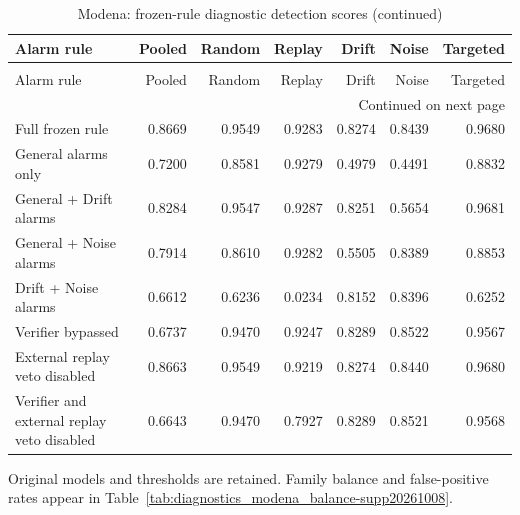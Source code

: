 \begingroup
\small
\setlength{\tabcolsep}{4pt}
\renewcommand{\arraystretch}{1.1}
\begin{longtable}{@{}p{.29\linewidth}rrrrrr@{}}
\caption{Modena: frozen-rule diagnostic detection scores}\label{tab:diagnostics_modena_detection-supp20261008}\\
\toprule
Alarm rule & Pooled & Random & Replay & Drift & Noise & Targeted \\
\midrule
\endfirsthead
\caption[]{Modena: frozen-rule diagnostic detection scores (continued)}\\
\toprule
Alarm rule & Pooled & Random & Replay & Drift & Noise & Targeted \\
\midrule
\endhead
\midrule
\multicolumn{7}{r}{Continued on next page}\\
\endfoot
\bottomrule
\endlastfoot
Full frozen rule & 0.8669 & 0.9549 & 0.9283 & 0.8274 & 0.8439 & 0.9680 \\
General alarms only & 0.7200 & 0.8581 & 0.9279 & 0.4979 & 0.4491 & 0.8832 \\
General + Drift alarms & 0.8284 & 0.9547 & 0.9287 & 0.8251 & 0.5654 & 0.9681 \\
General + Noise alarms & 0.7914 & 0.8610 & 0.9282 & 0.5505 & 0.8389 & 0.8853 \\
Drift + Noise alarms & 0.6612 & 0.6236 & 0.0234 & 0.8152 & 0.8396 & 0.6252 \\
Verifier bypassed & 0.6737 & 0.9470 & 0.9247 & 0.8289 & 0.8522 & 0.9567 \\
External replay veto disabled & 0.8663 & 0.9549 & 0.9219 & 0.8274 & 0.8440 & 0.9680 \\
Verifier and external replay veto disabled & 0.6643 & 0.9470 & 0.7927 & 0.8289 & 0.8521 & 0.9568 \\
\end{longtable}
\noindent\footnotesize Original models and thresholds are retained. Family balance and false-positive rates appear in Table~\ref{tab:diagnostics_modena_balance-supp20261008}.
\par\endgroup
